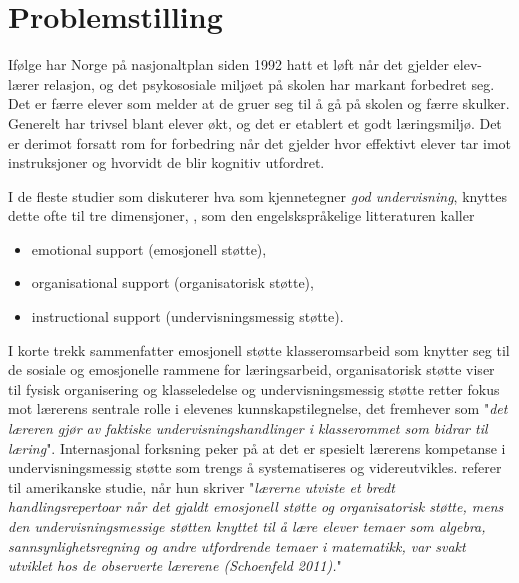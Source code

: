 \documentclass[main.tex]{subfiles}
\begin{document}
\section*{Problemstilling}
Ifølge  har Norge på nasjonaltplan siden 1992 hatt et løft når det gjelder elev-lærer 
relasjon, og det psykososiale miljøet på skolen har markant forbedret seg. Det er færre elever 
som melder at de gruer seg til å gå på skolen og færre skulker. Generelt har trivsel 
blant elever økt, og det er etablert et godt læringsmiljø. Det er derimot forsatt rom for
forbedring når det gjelder hvor effektivt elever tar imot instruksjoner og hvorvidt de blir 
kognitiv utfordret. 
\newline

I de fleste studier som diskuterer hva som kjennetegner \emph{god undervisning}, knyttes 
dette ofte til tre dimensjoner, , som den engelskspråkelige litteraturen 
kaller 
\begin{itemize}
\item emotional support (emosjonell støtte),
\item organisational support (organisatorisk støtte),
\item instructional support (undervisningsmessig støtte).
\end{itemize}
I korte trekk sammenfatter emosjonell støtte klasseromsarbeid som knytter
seg til de sosiale og emosjonelle rammene for læringsarbeid, %
organisatorisk støtte viser til fysisk organisering og klasseledelse %
og undervisningsmessig støtte retter fokus mot lærerens sentrale rolle i elevenes 
kunnskapstilegnelse, det  fremhever som "\emph{det læreren gjør av faktiske 
undervisningshandlinger i klasserommet som bidrar til læring}".
Internasjonal forksning peker på at det er spesielt lærerens kompetanse i undervisningsmessig 
støtte som trengs å systematiseres og videreutvikles.  referer til amerikanske 
studie, når hun skriver
\newline
\newline
"\emph{lærerne utviste et bredt handlingsrepertoar når det gjaldt emosjonell støtte og 
organisatorisk støtte, mens den undervisningsmessige støtten knyttet til å lære elever temaer som 
algebra, sannsynlighetsregning og andre utfordrende temaer i matematikk, var svakt utviklet hos 
de observerte lærerene (Schoenfeld 2011).}"
\newline
\newline
\end{document}
